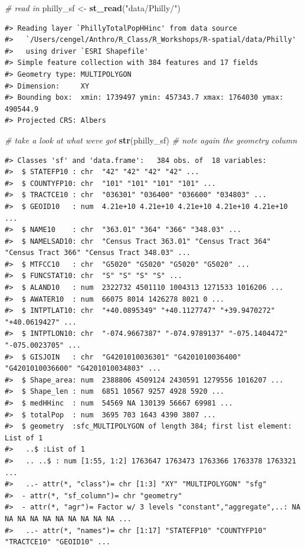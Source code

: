 \documentclass[
]{book}
\newenvironment{Shaded}{\begin{snugshade}}{\end{snugshade}}
\newcommand{\CommentTok}[1]{\textcolor[rgb]{0.56,0.35,0.01}{\textit{#1}}}
\newcommand{\FunctionTok}[1]{\textcolor[rgb]{0.13,0.29,0.53}{\textbf{#1}}}
\newcommand{\NormalTok}[1]{#1}
\newcommand{\OtherTok}[1]{\textcolor[rgb]{0.56,0.35,0.01}{#1}}
\newcommand{\StringTok}[1]{\textcolor[rgb]{0.31,0.60,0.02}{#1}}
\begin{document}
\begin{Shaded}
\begin{Highlighting}[]
\CommentTok{\# read in}
\NormalTok{philly\_sf }\OtherTok{\textless{}{-}} \FunctionTok{st\_read}\NormalTok{(}\StringTok{"data/Philly/"}\NormalTok{)}
\end{Highlighting}
\end{Shaded}

\begin{verbatim}
#> Reading layer `PhillyTotalPopHHinc' from data source 
#>   `/Users/cengel/Anthro/R_Class/R_Workshops/R-spatial/data/Philly' 
#>   using driver `ESRI Shapefile'
#> Simple feature collection with 384 features and 17 fields
#> Geometry type: MULTIPOLYGON
#> Dimension:     XY
#> Bounding box:  xmin: 1739497 ymin: 457343.7 xmax: 1764030 ymax: 490544.9
#> Projected CRS: Albers
\end{verbatim}

\begin{Shaded}
\begin{Highlighting}[]
\CommentTok{\# take a look at what we\textquotesingle{}ve got}
\FunctionTok{str}\NormalTok{(philly\_sf) }\CommentTok{\# note again the geometry column}
\end{Highlighting}
\end{Shaded}

\begin{verbatim}
#> Classes 'sf' and 'data.frame':   384 obs. of  18 variables:
#>  $ STATEFP10 : chr  "42" "42" "42" "42" ...
#>  $ COUNTYFP10: chr  "101" "101" "101" "101" ...
#>  $ TRACTCE10 : chr  "036301" "036400" "036600" "034803" ...
#>  $ GEOID10   : num  4.21e+10 4.21e+10 4.21e+10 4.21e+10 4.21e+10 ...
#>  $ NAME10    : chr  "363.01" "364" "366" "348.03" ...
#>  $ NAMELSAD10: chr  "Census Tract 363.01" "Census Tract 364" "Census Tract 366" "Census Tract 348.03" ...
#>  $ MTFCC10   : chr  "G5020" "G5020" "G5020" "G5020" ...
#>  $ FUNCSTAT10: chr  "S" "S" "S" "S" ...
#>  $ ALAND10   : num  2322732 4501110 1004313 1271533 1016206 ...
#>  $ AWATER10  : num  66075 8014 1426278 8021 0 ...
#>  $ INTPTLAT10: chr  "+40.0895349" "+40.1127747" "+39.9470272" "+40.0619427" ...
#>  $ INTPTLON10: chr  "-074.9667387" "-074.9789137" "-075.1404472" "-075.0023705" ...
#>  $ GISJOIN   : chr  "G4201010036301" "G4201010036400" "G4201010036600" "G4201010034803" ...
#>  $ Shape_area: num  2388806 4509124 2430591 1279556 1016207 ...
#>  $ Shape_len : num  6851 10567 9257 4928 5920 ...
#>  $ medHHinc  : num  54569 NA 130139 56667 69981 ...
#>  $ totalPop  : num  3695 703 1643 4390 3807 ...
#>  $ geometry  :sfc_MULTIPOLYGON of length 384; first list element: List of 1
#>   ..$ :List of 1
#>   .. ..$ : num [1:55, 1:2] 1763647 1763473 1763366 1763378 1763321 ...
#>   ..- attr(*, "class")= chr [1:3] "XY" "MULTIPOLYGON" "sfg"
#>  - attr(*, "sf_column")= chr "geometry"
#>  - attr(*, "agr")= Factor w/ 3 levels "constant","aggregate",..: NA NA NA NA NA NA NA NA NA NA ...
#>   ..- attr(*, "names")= chr [1:17] "STATEFP10" "COUNTYFP10" "TRACTCE10" "GEOID10" ...
\end{verbatim}
\end{document}
